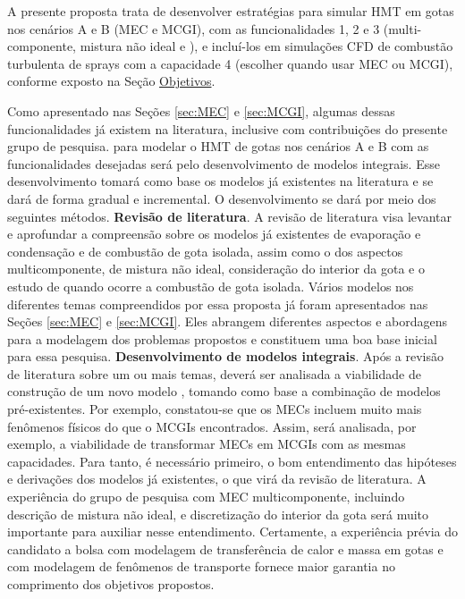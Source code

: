 A presente proposta trata de desenvolver estratégias para simular HMT em gotas nos cenários {A} e {B} (MEC e MCGI), com as funcionalidades {1}, {2} e {3} (multi-componente, mistura não ideal e ), e incluí-los em simulações CFD de combustão turbulenta de sprays com a capacidade 4 (escolher quando usar MEC ou MCGI), conforme exposto na Seção \hyperref[sec:objetivos]{Objetivos}.

Como apresentado nas Seções \ref{sec:MEC} e \ref{sec:MCGI}, algumas dessas funcionalidades já existem na literatura, inclusive com contribuições do presente grupo de pesquisa.
 para modelar o HMT de gotas nos cenários {A} e {B} com as funcionalidades desejadas será pelo desenvolvimento de modelos integrais.
Esse desenvolvimento tomará como base os modelos já existentes na literatura e se dará de forma gradual e incremental.
O desenvolvimento se dará por meio dos seguintes métodos.
\textbf{Revisão de literatura}. 
A revisão de literatura visa levantar e aprofundar a compreensão sobre os modelos já  existentes de evaporação e condensação e de combustão de gota isolada, assim como o dos aspectos multicomponente, de mistura não ideal, consideração do interior da gota e o estudo de quando ocorre a combustão de gota isolada.
Vários modelos nos diferentes temas compreendidos por essa proposta já foram apresentados nas Seções \ref{sec:MEC} e \ref{sec:MCGI}.
Eles abrangem diferentes aspectos e abordagens para a modelagem dos problemas propostos e constituem uma boa base inicial para essa pesquisa. 
\textbf{Desenvolvimento de modelos integrais}.
Após a revisão de literatura sobre um ou mais temas, deverá ser analisada a viabilidade de construção de um novo modelo , tomando como base a combinação de modelos  pré-existentes.
Por exemplo, constatou-se que os MECs incluem muito mais fenômenos físicos do que o MCGIs encontrados. 
Assim, será analisada, por exemplo, a viabilidade de transformar MECs em MCGIs com as mesmas capacidades.
Para tanto, é necessário primeiro, o bom entendimento das hipóteses e derivações dos modelos já existentes, o que virá da revisão de literatura.   
A experiência do grupo de pesquisa com MEC multicomponente, incluindo descrição de mistura não ideal, e discretização do interior da gota será muito importante para auxiliar nesse entendimento.
Certamente, a experiência prévia do candidato a bolsa com modelagem de transferência de calor e massa em gotas \cite{HenningsJ2024MT} e com modelagem de fenômenos de transporte \cite{HenningsJ2023BT,DokozaT2024,DokozaT2025,DeBroeckL2025} fornece maior garantia no comprimento dos objetivos propostos. %
